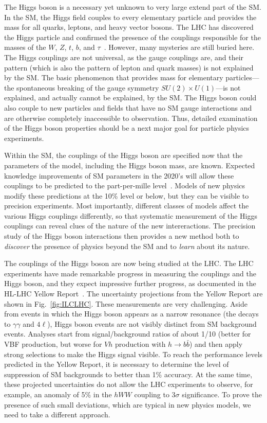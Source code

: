 \documentclass[%
 reprint,
 amsmath,amssymb,
 aps,
]{revtex4-1}
\begin{document}
The Higgs boson is a necessary yet unknown to very large extend part of the SM.    In the SM, the Higgs field
couples to every elementary particle and provides the mass for all
quarks, leptons, and heavy vector bosons.   The LHC has discovered
the Higgs particle and confirmed the presence of the couplings responsible for the
masses of the $W$, $Z$, $t$, $b$, and $\tau$~\cite{LHCHiggssummary}. 
 However, many mysteries are still
buried here.   The Higgs couplings are not universal, as the gauge
couplings are, and their pattern (which is also the pattern of lepton
and quark masses) is not explained by the SM.  The basic phenomenon that provides
mass for elementary particles---the spontaneous breaking of the gauge
symmetry $SU(2)\times U(1)$---is not explained, and actually cannot be
explained, by the SM.   The Higgs boson could also couple to new
particles and fields that have no SM gauge interactions and are
otherwise completely inaccessible to observation.  Thus, detailed
examination of the Higgs boson properties should be a next major
goal for particle physics experiments.

Within the SM, the couplings of the Higgs boson are specified now that
the parameters of the model, including the Higgs boson mass, are
known.  Expected knowledge improvements of SM parameters in the 2020's will allow these couplings to be predicted to the part-per-mille level~\cite{Lepage:2014fla}.
Models of new physics modify these predictions at the 10\% level or below, but they can
be visible to precision experiments.   Most importantly, different
classes of models affect the various Higgs couplings differently, so that
systematic measurement of the Higgs couplings can reveal clues of the
nature of the new intereractions.   The precision study of the Higgs
boson interactions then provides a new method both to {\it discover}  the
presence of physics beyond the SM and to {\it learn}  about its nature.

The couplings of the Higgs boson are now being studied at the LHC.
The LHC experiments have made remarkable progress in measuring the
couplings and the Higgs boson, and they expect impressive further progress, as
documented in the HL-LHC Yellow Report~\cite{Yellow}.  The uncertainty
projections
from the Yellow Report  are shown in Fig.~\ref{fig:ILCLHC}.   These
measurements are very challenging.   Aside from events in
which the Higgs boson appears as a narrow resonance (the decays to
$\gamma\gamma$ and $4\ell$), Higgs boson events are not visibly
distinct from SM background events.  Analyses start from
signal/background ratios of about  1/10  (better for VBF production,
but 
worse for $Vh$ production with $h\to b\bar b$) and then apply strong
selections to make the Higgs signal visible.   To reach the
performance levels predicted in  the Yellow Report, it is necessary to
determine the level of suppression of SM backgrounds to better than
 1\% accuracy.  At
the same time, these projected uncertainties do not allow the LHC experiments to
observe, for example, an anomaly of 5\% in the $hWW$ coupling to
3$\sigma$ significance.   To prove the presence of such small
deviations, which are typical in new physics models, we need to take a
different approach. 
\end{document}
